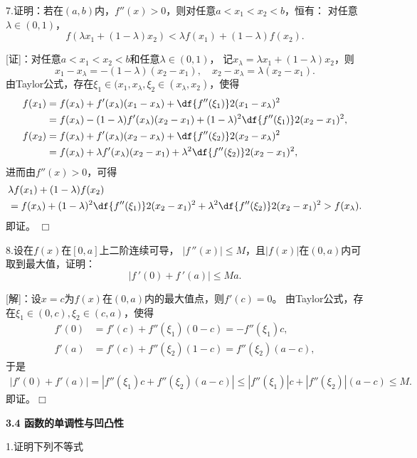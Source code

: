 \bigskip

7.证明：若在$(a,b)$内，$f''(x)>0$，则对任意$a<x_1<x_2<b$，恒有：
对任意$\lambda\in(0,1)$，
$$f(\lambda x_1+(1-\lambda)x_2)<\lambda
f(x_1)+(1-\lambda)f(x_2).$$

[证]：对任意$a<x_1<x_2<b$和任意$\lambda\in(0,1)$，
记$x_{\lambda}=\lambda x_1+(1-\lambda)x_2$，则
$$x_1-x_{\lambda}=-(1-\lambda)(x_2-x_1),\quad
x_2-x_{\lambda}=\lambda(x_2-x_1).$$
由Taylor公式，存在$\xi_1\in(x_1,x_{\lambda},
\xi_2\in(x_{\lambda},x_2)$，使得
\begin{align*}
	f(x_1)&=f(x_{\lambda})+f'(x_{\lambda})(x_1-x_{\lambda})
	+\df{f''(\xi_1)}2(x_1-x_{\lambda})^2\\
	&=f(x_{\lambda})-(1-\lambda)f'(x_{\lambda})(x_2-x_1)
	+(1-\lambda)^2\df{f''(\xi_1)}2(x_2-x_1)^2,\\
	f(x_2)&=f(x_{\lambda})+f'(x_{\lambda})(x_2-x_{\lambda})
	+\df{f''(\xi_2)}2(x_2-x_{\lambda})^2\\
	&=f(x_{\lambda})+\lambda f'(x_{\lambda})(x_2-x_1)
	+\lambda^2\df{f''(\xi_2)}2(x_2-x_1)^2,
\end{align*}
进而由$f''(x)>0$，可得
\begin{align*}
	&\lambda f(x_1)+(1-\lambda)f(x_2)\\
	&=f(x_{\lambda})+(1-\lambda)^2\df{f''(\xi_1)}2(x_2-x_1)^2
	+\lambda^2\df{f''(\xi_2)}2(x_2-x_1)^2>f(x_{\lambda}).
\end{align*}
即证。
\hfill$\Box$

\bigskip

8.设在$f(x)$在$[0,a]$上二阶连续可导，
$|f\,''(x)|\leq M$，且$|f(x)|$在$(0,a)$内可取到最大值，证明：
$$|f\,'(0)+f\,'(a)|\leq Ma.$$	

[解]：设$x=c$为$f(x)$在$(0,a)$内的最大值点，则$f'(c)=0$。
由Taylor公式，存在$\xi_1\in(0,c),\xi_2\in(c,a)$，使得
\begin{align*}
	f'(0)&=f'(c)+f''(\xi_1)(0-c)=-f''(\xi_1)c,\\
	f'(a)&=f'(c)+f''(\xi_2)(1-c)=f''(\xi_2)(a-c),
\end{align*}
于是
\begin{align*}
	|f'(0)+f'(a)|=|f''(\xi_1)c+f''(\xi_2)(a-c)|
	\leq|f''(\xi_1)|c+|f''(\xi_2)|(a-c)\leq M.
\end{align*}
即证。\hfill$\Box$

\begin{center}
	\bf 3.4 函数的单调性与凹凸性
\end{center}

\bigskip

1.证明下列不等式

